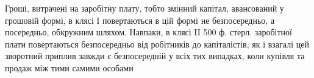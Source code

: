 Гроші, витрачені на заробітну плату, тобто змінний капітал, авансований
у грошовій формі, в клясі І повертаються в цій формі не безпосередньо,
а посередньо, обкружним шляхом. Навпаки, в клясі II 500 ф.
стерл. заробітної плати повертаються безпосередньо від робітників до
капіталістів, як і взагалі цей зворотний приплив завжди є безпосередній
у всіх тих випадках, коли купівля та продаж між тими самими особами
\parbreak{}  %
